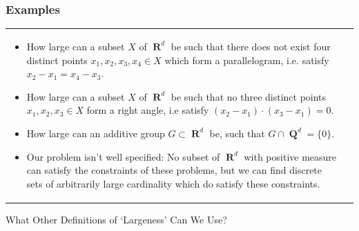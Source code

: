 \documentclass[usenames,dvipsnames,handout]{beamer}
\DeclareMathOperator{\RR}{\textbf{R}}
\DeclareMathOperator{\QQ}{\textbf{Q}}
\begin{document}
\begin{frame}
  \frametitle{Examples}

\begin{tabular}{p{}p{}}

\begin{itemize}
    \pause
    \item How large can a subset $X$ of $\RR^d$ be such that there does not exist four distinct points $x_1,x_2,x_3,x_4 \in X$ which form a parallelogram, i.e. satisfy $x_2 - x_1 = x_4 - x_3$.

    \pause
    \item How large can a subset $X$ of $\RR^d$ be such that no three distinct points $x_1,x_2,x_3 \in X$ form a right angle, i.e satisfy $(x_2 - x_1) \cdot (x_3 - x_1) = 0$.


    \pause
    \item How large can an additive group $G \subset \RR^d$ be, such that $G \cap \QQ^d = \{ 0 \}$.


    \pause
    \item Our problem isn't well specified: No subset of $\RR^d$ with positive measure can satisfy the constraints of these problems, but we can find discrete sets of arbitrarily large cardinality which do satisfy these constraints.
\end{itemize}

\end{tabular}
\end{frame}





\begin{frame}
    What Other Definitions of `Largeness' Can We Use?
\end{frame}
\end{document}
